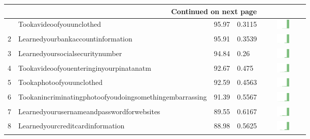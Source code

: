 \documentclass[a4paper,12pt]{article}
\begin{document}
\begin{longtable}{| p{0.5cm} | p{7cm} | p{1cm} |p{1cm} | c |}
\hline \multicolumn{4}{|r|}{{Continued on next page}} \\ \hline
\endfoot
\hline 
\endlastfoot
1 & Tookavideoofyouunclothed & 95.97&0.3115 & \includegraphics[width = 2cm, height = 0.5cm]{tables/tookavideoofyouunclothedcombined} \\ 
2 & Learnedyourbankaccountinformation & 95.91&0.3539 & \includegraphics[width = 2cm, height = 0.5cm]{tables/learnedyourbankaccountinformationcombined} \\ 
3 & Learnedyoursocialsecuritynumber & 94.84&0.26 & \includegraphics[width = 2cm, height = 0.5cm]{tables/learnedyoursocialsecuritynumbercombined} \\ 
4 & Tookavideoofyouenteringinyourpinatanatm & 92.67&0.475 & \includegraphics[width = 2cm, height = 0.5cm]{tables/tookavideoofyouenteringinyourPINatanATMcombined} \\ 
5 & Tookaphotoofyouunclothed & 92.59&0.4563 & \includegraphics[width = 2cm, height = 0.5cm]{tables/tookaphotoofyouunclothedcombined} \\ 
6 & Tookanincriminatingphotoofyoudoingsomethingembarrassing & 91.39&0.5567 & \includegraphics[width = 2cm, height = 0.5cm]{tables/tookanincriminatingphotoofyoudoingsomethingembarrassingcombined} \\ 
7 & Learnedyourusernameandpasswordforwebsites & 89.55&0.6167 & \includegraphics[width = 2cm, height = 0.5cm]{tables/learnedyourusernameandpasswordforwebsitescombined} \\ 
8 & Learnedyourcreditcardinformation & 88.98&0.5625 & \includegraphics[width = 2cm, height = 0.5cm]{tables/learnedyourcreditcardinformationcombined} \\ 

\end{longtable}
\end{document}
